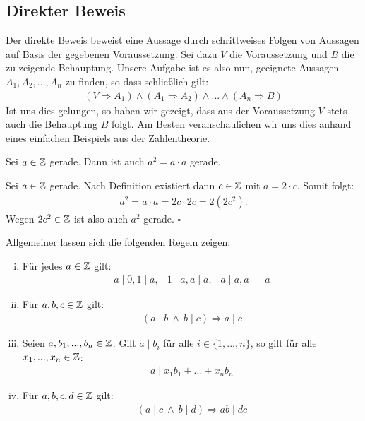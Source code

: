\subsection{Direkter Beweis}
Der direkte Beweis beweist eine Aussage durch schrittweises Folgen von Aussagen auf Basis der gegebenen Voraussetzung. 
Sei dazu $V$ die Voraussetzung und $B$ die zu zeigende Behauptung. Unsere Aufgabe ist es also nun, geeignete Aussagen $A_1, A_2,...,A_n$ zu finden, 
so dass schließlich gilt: 
\begin{align*}
    (V \Rightarrow A_1) \wedge (A_1 \Rightarrow A_2) \wedge ... \wedge (A_n \Rightarrow B)
\end{align*}
Ist uns dies gelungen, so haben wir gezeigt, dass aus der Voraussetzung $V$ stets auch die Behauptung $B$ folgt. 
Am Besten veranschaulichen wir uns dies anhand eines einfachen Beispiels aus der Zahlentheorie. 
\begin{proposition}
    Sei $a \in \mathbb{Z}$ gerade. Dann ist auch $a^2 = a \cdot a$ gerade. 
\end{proposition}


\begin{proof*}
    Sei $a \in \mathbb{Z}$ gerade. Nach Definition existiert dann $c \in \mathbb{Z}$ mit $a = 2 \cdot c$. Somit folgt: 
    \begin{align*}
        a^2 = a \cdot a = 2c \cdot 2c = 2(2c^2).
    \end{align*}
    Wegen $2c^2 \in \mathbb{Z}$ ist also auch $a^2$ gerade. 
    \hfill $\square$
\end{proof*}

Allgemeiner lassen sich die folgenden Regeln zeigen:

\begin{theorem}
    \begin{enumerate}[(i)]
        \item 
        Für jedes $a \in \mathbb{Z}$ gilt: 
        \begin{align*}
            a \mid 0, 1 \mid a, -1 \mid a, a \mid a, -a \mid a, a \mid -a
        \end{align*}
        \item 
        Für $a,b,c \in \mathbb{Z}$ gilt: 
        \begin{align*}
            (a \mid b \ \wedge \ b \mid c) \Rightarrow a \mid c 
        \end{align*}
        \item 
        Seien $a,b_1,...,b_n \in \mathbb{Z}$. Gilt $a \mid b_i$ für alle $i \in \{1,...,n\}$, so gilt für alle $x_1,...,x_n \in \mathbb{Z}$: 
        \begin{align*}
            a \mid x_1 b_1 + ... + x_n b_n 
        \end{align*}
        \item 
        Für $a,b,c,d \in \mathbb{Z}$ gilt: 
        \begin{align*}
            (a \mid c \ \wedge  \ b \mid d) \Rightarrow ab \mid dc 
        \end{align*}
    \end{enumerate}
\end{theorem}

